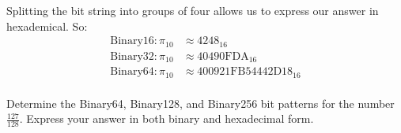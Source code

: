 \documentclass[11pt,twoside,openany]{memoir}
\begin{document}
\begin{solution}
            Splitting the bit string into groups of four allows us to express our answer in hexademical. So:
                \begin{equation*}
                \begin{split}
                    \text{Binary}16: \pi_{10} &\approx 4248_{16} \\
                    \text{Binary}32: \pi_{10} &\approx 40490\text{FDA}_{16} \\
                    \text{Binary}64: \pi_{10} &\approx 400921\text{FB}54442\text{D}18_{16} \\
                \end{split}
                \end{equation*}
        \end{solution}
    \begin{problem}
        Determine the Binary64, Binary128, and Binary256 bit patterns for the number $\frac{127}{128}$. Express your answer in both binary and hexadecimal form.
    \end{problem}
\end{document}
